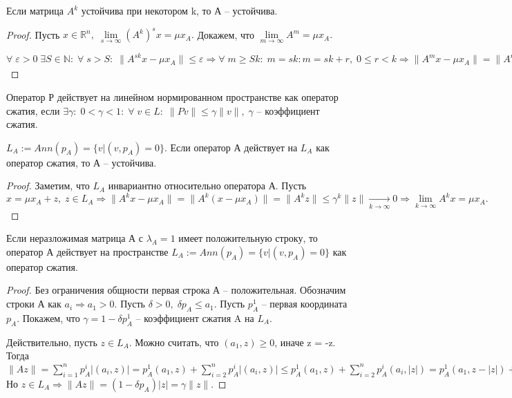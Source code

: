 \begin{lemma}
	Если матрица $A^k$ устойчива при некотором k, то А -- устойчива.
\end{lemma}

\begin{proof}
	Пусть $x \in \mathbb{R}^n, \; \lim\limits_{s \to \infty}(A^k)^sx = \mu x_A.$ Докажем, что $\lim\limits_{m \to \infty}A^m = \mu x_A.$

	$\forall \; \varepsilon > 0 \; \exists S \in \mathbb{N}: \; \forall \; s > S: \; \| A^{sk}x - \mu x_A \| \leq \varepsilon \Rightarrow \forall \; m \geq Sk: \; m = sk : m = sk + r, \; 0 \leq r < k \Rightarrow \| A^{m}x - \mu x_A \| = \| A^{r}(A^{sk}(x - \mu x_A)) \| \leq \| A^{sk}(x - \mu x_A) \| < \varepsilon.$
\end{proof}

\begin{definition}
	Оператор Р действует на линейном нормированном пространстве как оператор сжатия, если $\exists \gamma: \; 0 < \gamma < 1: \; \forall \; v \in L: \; \| Pv\| \leq \gamma \| v\|, \; \gamma $ -- коэффициент сжатия. 
\end{definition}

\begin{lemma}
	$L_A:= Ann(p_A) = \{ v | (v, p_A) = 0\}.$ Если оператор А действует на $L_A$ как оператор сжатия, то А -- устойчива.
\end{lemma}

\begin{proof}
	Заметим, что $L_A$ инвариантно относительно оператора А. Пусть $x = \mu x_A + z, \; z \in L_A \Rightarrow \| A^{k}x - \mu x_A \| = \| A^{k}(x - \mu x_A) \| = \| A^{k}z \| \leq \gamma^k \| z \| \underset{k \to \infty}{\to}0 \Rightarrow \lim\limits_{k \to \infty}A^kx = \mu x_A.$
\end{proof}

\begin{lemma}
	Если неразложимая матрица А с $\lambda_A = 1$ имеет положительную строку, то оператор А действует на пространстве $L_A:= Ann(p_A) = \{ v | (v, p_A) = 0\}$ как оператор сжатия.
\end{lemma}

\begin{proof}
	Без ограничения общности первая строка А -- положительная. Обозначим строки А как $a_i \Rightarrow a_1 > 0.$ Пусть $\delta > 0, \; \delta p_A \leq a_1.$ Пусть $p_A^1$ -- первая координата $p_A$. Покажем, что $\gamma = 1 - \delta p_A^1$ -- коэффициент сжатия A на $L_A$. 

	Действительно, пусть $z \in L_A.$ Можно считать, что $(a_1, z) \geq 0$, иначе z = -z. Тогда $\| Az \| = \sum\limits_{i = 1}^n p_A^i | (a_i, z) | = p_A^1 (a_1, z) + \sum\limits_{i = 2}^n p_A^i | (a_i, z) | \leq p_A^1 (a_1, z) + \sum\limits_{i = 2}^n p_A^i (a_i, |z|) = p_A^1 (a_1, z - |z|) + \sum\limits_{i = 1}^n p_A^i (a_i, |z|) = p_A^1 (a_1, z - |z|) + (p_A, A|z|) \leq p_A^1 (\delta p_A,z - |z|) + (p_A, A|z|), \text{ так как } z - |z| \leq 0.$ Но $z \in L_A \Rightarrow \| Az\| = (1 - \delta p_A) |z| = \gamma \| z \|.$
\end{proof}

